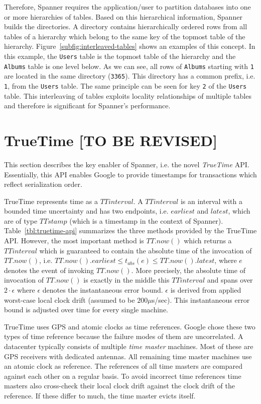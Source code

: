 \documentclass[onecolumn, a4paper, 10pt]{article}
\newcommand{\tbr}{{\color{red}\textbf{[TO BE REVISED]}}}
\begin{document}
Therefore, Spanner requires the application/user to partition databases into
one or more hierarchies of tables. Based on this hierarchical information, Spanner
builds the directories. A directory contains hierarchically ordered rows from
all tables of a hierarchy which belong to the same key of the topmost table of
the hierarchy. Figure~\ref{subfig:interleaved-tables} shows an examples of this
concept. In this example, the \texttt{Users} table is the topmost table of the
hierarchy and the \texttt{Albums} table is one level below. As we can see, all
rows of \texttt{Albums} starting with \texttt{1} are located in the same directory
(\texttt{3365}). This directory has a common prefix, i.e. \texttt{1}, from the
\texttt{Users} table. The same principle can be seen for key \texttt{2} of the
\texttt{Users} table. This interleaving of tables exploits locality relationships
of multiple tables and therefore is significant for Spanner's performance.

\section{TrueTime \tbr}
\label{sec:truetime}

This section describes the key enabler of Spanner, i.e. the novel \emph{TrueTime}
API. Essentially, this API enables Google to provide timestamps for transactions
which reflect serialization order.

TrueTime represents time as a $TTinterval$. A $TTinterval$ is an interval with a
bounded time uncertainty and has two endpoints, i.e. $earliest$ and $latest$,
which are of type $TTstamp$ (which is a timestamp in the context of Spanner).
Table~\ref{tbl:truetime-api} summarizes the three methods provided by the TrueTime
API. However, the most important method is $TT.now()$ which returns a $TTinterval$
which is guaranteed to contain the absolute time of the invocation of $TT.now()$,
i.e. $TT.now().earliest \leq t_{abs}(e) \leq TT.now().latest$, where $e$ denotes
the event of invoking $TT.now()$. More precisely, the absolute time of invocation
of $TT.now()$ is exactly in the middle this $TTinterval$ and spans over
$2\cdot\epsilon$ where $\epsilon$ denotes the instantaneous error bound. $\epsilon$
is derived from applied worst-case local clock drift (assumed to be
$200\mu$s/sec). This instantaneous error bound is adjusted over time for every
single machine.

TrueTime uses GPS and atomic clocks as time references. Google chose these two
types of time reference because the failure modes of them are uncorrelated. A
datacenter typically consists of multiple \emph{time master} machines. Most of
these are GPS receivers with dedicated antennas. All remaining time master
machines use an atomic clock as reference. The references of all time masters are
compared against each other on a regular basis. To avoid incorrect time references
time masters also cross-check their local clock drift against the clock drift of
the reference. If these differ to much, the time master evicts itself.
\end{document}
